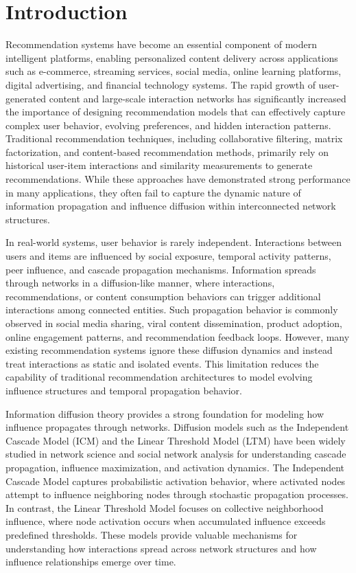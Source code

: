 \documentclass{article}
\begin{document}
\section{Introduction}

Recommendation systems have become an essential component of modern intelligent platforms, enabling personalized content delivery across applications such as e-commerce, streaming services, social media, online learning platforms, digital advertising, and financial technology systems. The rapid growth of user-generated content and large-scale interaction networks has significantly increased the importance of designing recommendation models that can effectively capture complex user behavior, evolving preferences, and hidden interaction patterns. Traditional recommendation techniques, including collaborative filtering, matrix factorization, and content-based recommendation methods, primarily rely on historical user-item interactions and similarity measurements to generate recommendations. While these approaches have demonstrated strong performance in many applications, they often fail to capture the dynamic nature of information propagation and influence diffusion within interconnected network structures.

In real-world systems, user behavior is rarely independent. Interactions between users and items are influenced by social exposure, temporal activity patterns, peer influence, and cascade propagation mechanisms. Information spreads through networks in a diffusion-like manner, where interactions, recommendations, or content consumption behaviors can trigger additional interactions among connected entities. Such propagation behavior is commonly observed in social media sharing, viral content dissemination, product adoption, online engagement patterns, and recommendation feedback loops. However, many existing recommendation systems ignore these diffusion dynamics and instead treat interactions as static and isolated events. This limitation reduces the capability of traditional recommendation architectures to model evolving influence structures and temporal propagation behavior.

Information diffusion theory provides a strong foundation for modeling how influence propagates through networks. Diffusion models such as the Independent Cascade Model (ICM) and the Linear Threshold Model (LTM) have been widely studied in network science and social network analysis for understanding cascade propagation, influence maximization, and activation dynamics. The Independent Cascade Model captures probabilistic activation behavior, where activated nodes attempt to influence neighboring nodes through stochastic propagation processes. In contrast, the Linear Threshold Model focuses on collective neighborhood influence, where node activation occurs when accumulated influence exceeds predefined thresholds. These models provide valuable mechanisms for understanding how interactions spread across network structures and how influence relationships emerge over time.
\end{document}
